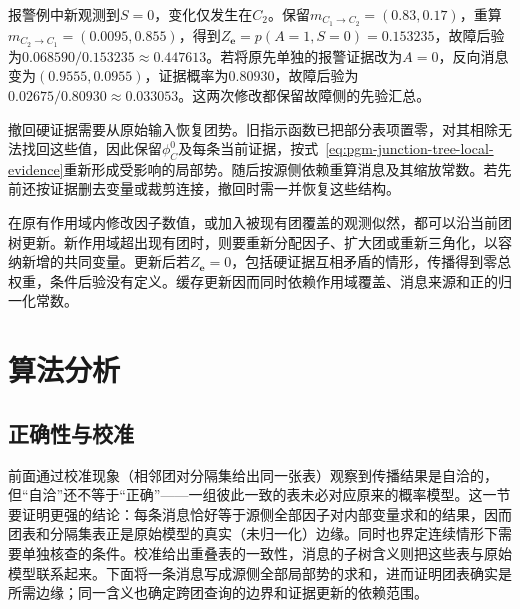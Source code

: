 报警例中新观测到$S=0$，变化仅发生在$C_2$。保留$m_{C_1\to C_2}=(0.83,0.17)$，重算$m_{C_2\to C_1}=(0.0095,0.855)$，得到$Z_{\bm e}=p(A=1,S=0)=0.153235$，故障后验为$0.068590/0.153235\approx0.447613$。若将原先单独的报警证据改为$A=0$，反向消息变为$(0.9555,0.0955)$，证据概率为$0.80930$，故障后验为$0.02675/0.80930\approx0.033053$。这两次修改都保留故障侧的先验汇总。

撤回硬证据需要从原始输入恢复团势。旧指示函数已把部分表项置零，对其相除无法找回这些值，因此保留$\phi_C^0$及每条当前证据，按式~\eqref{eq:pgm-junction-tree-local-evidence}重新形成受影响的局部势。随后按源侧依赖重算消息及其缩放常数。若先前还按证据删去变量或裁剪连接，撤回时需一并恢复这些结构。

在原有作用域内修改因子数值，或加入被现有团覆盖的观测似然，都可以沿当前团树更新。新作用域超出现有团时，则要重新分配因子、扩大团或重新三角化，以容纳新增的共同变量。更新后若$Z_{\bm e}=0$，包括硬证据互相矛盾的情形，传播得到零总权重，条件后验没有定义。缓存更新因而同时依赖作用域覆盖、消息来源和正的归一化常数。

\section{算法分析}
\label{sec:pgm-junction-tree-analysis}

\subsection{正确性与校准}
\label{sec:pgm-junction-tree-correctness}

前面通过校准现象（相邻团对分隔集给出同一张表）观察到传播结果是自洽的，但“自洽”还不等于“正确”——一组彼此一致的表未必对应原来的概率模型。这一节要证明更强的结论：每条消息恰好等于源侧全部因子对内部变量求和的结果，因而团表和分隔集表正是原始模型的真实（未归一化）边缘。同时也界定连续情形下需要单独核查的条件。校准给出重叠表的一致性，消息的子树含义则把这些表与原始模型联系起来。下面将一条消息写成源侧全部局部势的求和，进而证明团表确实是所需边缘；同一含义也确定跨团查询的边界和证据更新的依赖范围。

